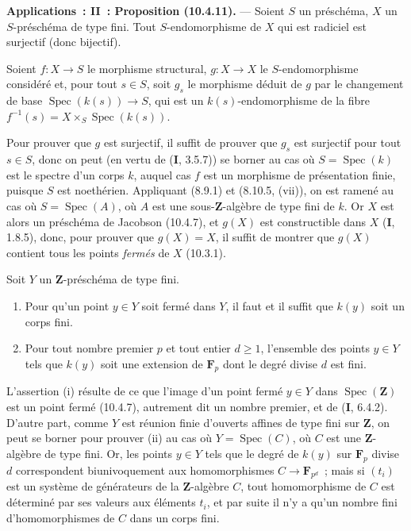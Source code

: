 \begin{env}[10.4.11]
\textbf{Applications~: II~: Proposition (10.4.11).} --- Soient $S$ un
préschéma, $X$ un $S$-préschéma de type fini. Tout $S$-endomorphisme de $X$
qui est radiciel est surjectif (donc bijectif).
\end{env}

Soient $f:X\to S$ le morphisme structural, $g:X\to X$ le $S$-endomorphisme
considéré et, pour tout $s\in S$, soit $g_s$ le morphisme déduit de $g$ par le
changement de base $\operatorname{Spec}(k(s))\to S$, qui est un
$k(s)$-endomorphisme de la fibre
$f^{-1}(s)=X\times_S\operatorname{Spec}(k(s))$.

Pour prouver que $g$ est surjectif, il suffit de prouver que $g_s$ est
surjectif pour tout $s\in S$, donc on peut (en vertu de (\textbf{I}, 3.5.7))
se borner au cas où $S=\operatorname{Spec}(k)$ est le spectre d'un corps $k$,
auquel cas $f$ est un morphisme de présentation finie, puisque $S$ est
noethérien. Appliquant (8.9.1) et (8.10.5, (vii)), on est ramené au cas où
$S=\operatorname{Spec}(A)$, où $A$ est une sous-$\mathbf Z$-algèbre de type
fini de $k$. Or $X$ est alors un préschéma de Jacobson (10.4.7), et $g(X)$ est
constructible dans $X$ (\textbf{I}, 1.8.5), donc, pour prouver que $g(X)=X$,
il suffit de montrer que $g(X)$ contient tous les points \emph{fermés} de $X$
(10.3.1).

\begin{lemma}[10.4.11.1]
\label{IV.10.4.11.1-fr}
Soit $Y$ un $\mathbf Z$-préschéma de type fini.
\begin{enumerate}[label=(\roman*)]
  \item Pour qu'un point $y\in Y$ soit fermé dans $Y$, il faut et il suffit
  que $k(y)$ soit un corps fini.
  \item Pour tout nombre premier $p$ et tout entier $d\geq1$, l'ensemble des
  points $y\in Y$ tels que $k(y)$ soit une extension de $\mathbf F_p$ dont le
  degré divise $d$ est fini.
\end{enumerate}
\end{lemma}

L'assertion (i) résulte de ce que l'image d'un point fermé $y\in Y$ dans
$\operatorname{Spec}(\mathbf Z)$ est un point fermé (10.4.7), autrement dit
un nombre premier, et de (\textbf{I}, 6.4.2). D'autre part, comme $Y$ est
réunion finie d'ouverts affines de type fini sur $\mathbf Z$, on peut se
borner pour prouver (ii) au cas où $Y=\operatorname{Spec}(C)$, où $C$ est une
$\mathbf Z$-algèbre de type fini. Or, les points $y\in Y$ tels que le degré de
$k(y)$ sur $\mathbf F_p$ divise $d$ correspondent biunivoquement aux
homomorphismes $C\to\mathbf F_{p^d}$~; mais si $(t_i)$ est un système de
générateurs de la $\mathbf Z$-algèbre $C$, tout homomorphisme de $C$ est
déterminé par ses valeurs aux éléments $t_i$, et par suite il n'y a qu'un
nombre fini d'homomorphismes de $C$ dans un corps fini.

